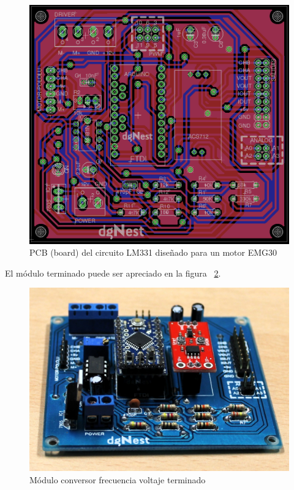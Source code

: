 \begin{figure}[h!]
  \centering
  \includegraphics[scale=0.3]{images/activities/motor_emg30/board-motor-emg30.png}
  \caption{PCB (board) del circuito LM331 diseñado para un motor EMG30}
  \label{fig:board-motor-emg30}
\end{figure}

El módulo terminado puede ser apreciado en la figura ~\ref{fig:modulo-emg30-1}.

\begin{figure}[h!]
  \centering
  \includegraphics[scale=0.25]{images/activities/motor_emg30/modulo-emg30-1.jpg}
  \caption{Módulo conversor frecuencia voltaje terminado}
  \label{fig:modulo-emg30-1}
\end{figure}

